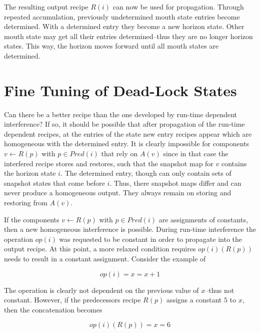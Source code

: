 \documentclass[12pt,a4paper]{scrartcl}
\begin{document}
The resulting output recipe $R(i)$ can now be used for propagation. Through
repeated accumulation, previously undetermined mouth state entries become
determined. With a determined entry they become a new horizon state. Other
mouth state may get all their entries determined--thus they are no longer
horizon states. This way, the horizon moves forward until all mouth states are
determined. 

%
\section{Fine Tuning of Dead-Lock States}

Can there be a better recipe than the one developed by run-time dependent
interference? If so, it should be possible that after propagation of the
run-time dependent recipes, at the entries of the state new entry recipes
appear which are homogeneous with the determined entry. It is clearly
impossible for components $v \leftarrow R(p)$ with $p \in Pred(i)$ that rely on
$A(v)$ since in that case the interfered recipe stores and restores, such that
the snapshot map for $v$ contains the horizon state $i$. The determined entry,
though can only contain sets of snapshot states that come before $i$. Thus,
there snapshot maps differ and can never produce a homogeneous output. They
always remain on storing and restoring from $A(v)$.

If the components $v \leftarrow R(p)$ with $p \in Pred(i)$ are assignments of
constants, then a new homogeneous interference is possible. During run-time
interference the operation $op(i)$ was requested to be constant in order to
propagate into the output recipe. At this point, a more relaxed condition
requires $op(i)(R(p))$ needs to result in a constant assignment. Consider the
example of 

\begin{equation}
                       op(i) = { x = x + 1 }
\end{equation}

The operation is clearly not dependent on the previous value of $x$--thus not
constant. However, if the predecessors recipe $R(p)$ assigns a constant $5$ to
$x$, then the concatenation becomes

\begin{equation}
                       op(i)(R(p)) = { x = 6 }
\end{equation}
\end{document}
